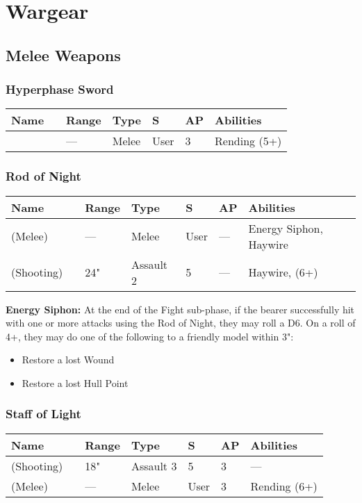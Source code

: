 \section{Wargear}

\subsection{Melee Weapons} \label{Melee Weapons}

\subsubsection{Hyperphase Sword} \label{Hyperphase Sword}
\noindent
\begin{tabular}{||m{110pt} m{30pt} m{31pt} m{55pt} m{12pt} m{12pt} m{210pt}||}
	\hline
	Name & & Range & Type & S & AP & Abilities \\
	\hline
	\quickref{Hyperphase Sword} &  & — & Melee & User & 3 & Rending (5+) \\
	\hline
\end{tabular}

\subsubsection{Rod of Night} \label{Rod of Night}
\noindent
\begin{tabular}{||m{110pt} m{30pt} m{31pt} m{55pt} m{12pt} m{12pt} m{210pt}||}
	\hline
	Name & & Range & Type & S & AP & Abilities \\
	\hline
	\quickref{Rod of Night} (Melee) & & — & Melee & User & — & Energy Siphon, Haywire \\
	\quickref{Rod of Night} (Shooting) & & 24" & Assault 2 & 5 & — & Haywire, \quickref{Tesla} (6+) \\
	\hline
\end{tabular}
\label{Energy Siphon}
\textbf{Energy Siphon:} At the end of the Fight sub-phase, if the bearer successfully hit with one or more attacks using the Rod of Night, they may roll a D6. On a roll of 4+, they may do one of the following to a friendly model within 3":
\begin{itemize}
	\item Restore a lost Wound
	\item Restore a lost Hull Point
\end{itemize}
	

\subsubsection{Staff of Light} \label{Staff of Light}
\noindent
\begin{tabular}{||m{110pt} m{30pt} m{31pt} m{55pt} m{12pt} m{12pt} m{210pt}||}
	\hline
	Name & & Range & Type & S & AP & Abilities \\
	\hline
	\quickref{Staff of Light} (Shooting) & & 18" & Assault 3 & 5 & 3 & — \\
	\quickref{Staff of Light} (Melee) & & — & Melee & User & 3 & Rending (6+) \\
	\hline
\end{tabular}

